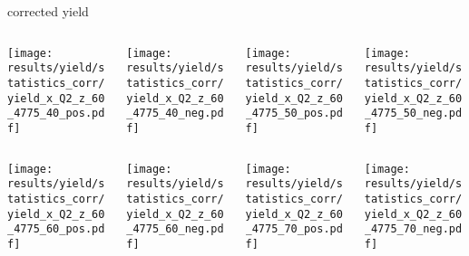 \begin{frame}{corrected yield}
\begin{columns}
\begin{column}[T]{0.25\textwidth}
\texttt{[image: results/yield/statistics\_corr/yield\_x\_Q2\_z\_60\_4775\_40\_pos.pdf]}
\end{column}
\begin{column}[T]{0.25\textwidth}
\texttt{[image: results/yield/statistics\_corr/yield\_x\_Q2\_z\_60\_4775\_40\_neg.pdf]}
\end{column}
\begin{column}[T]{0.25\textwidth}
\texttt{[image: results/yield/statistics\_corr/yield\_x\_Q2\_z\_60\_4775\_50\_pos.pdf]}
\end{column}
\begin{column}[T]{0.25\textwidth}
\texttt{[image: results/yield/statistics\_corr/yield\_x\_Q2\_z\_60\_4775\_50\_neg.pdf]}
\end{column}
\end{columns}
\begin{columns}
\begin{column}[T]{0.25\textwidth}
\texttt{[image: results/yield/statistics\_corr/yield\_x\_Q2\_z\_60\_4775\_60\_pos.pdf]}
\end{column}
\begin{column}[T]{0.25\textwidth}
\texttt{[image: results/yield/statistics\_corr/yield\_x\_Q2\_z\_60\_4775\_60\_neg.pdf]}
\end{column}
\begin{column}[T]{0.25\textwidth}
\texttt{[image: results/yield/statistics\_corr/yield\_x\_Q2\_z\_60\_4775\_70\_pos.pdf]}
\end{column}
\begin{column}[T]{0.25\textwidth}
\texttt{[image: results/yield/statistics\_corr/yield\_x\_Q2\_z\_60\_4775\_70\_neg.pdf]}
\end{column}
\end{columns}
\end{frame}
